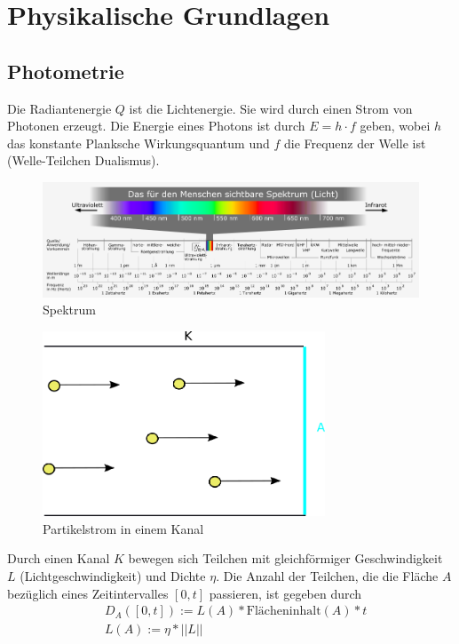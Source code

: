 

\section{Physikalische Grundlagen}

\subsection{Photometrie}

Die Radiantenergie $Q$ ist die Lichtenergie. Sie wird durch einen Strom von Photonen erzeugt. Die Energie eines Photons ist 
durch $E=h \cdot f$ geben, wobei $h$ das konstante Planksche Wirkungsquantum und $f$ die Frequenz der Welle ist (Welle-Teilchen Dualismus).  

 \begin{figure}[H]
    \centering
    \includegraphics[width=1.0\textwidth]{images/Electromagnetic_spectrum_c.png}
    \caption{Spektrum}
    \label{fig:cray}
\end{figure}


 \begin{figure}[H]
    \centering
    \includegraphics[width=0.75\textwidth]{images/Partikelstrom.png}
    \caption{Partikelstrom in einem Kanal}
    \label{fig:cray}
\end{figure}
Durch einen Kanal $K$ bewegen  sich Teilchen mit gleichförmiger Geschwindigkeit $L$ (Lichtgeschwindigkeit)  und  Dichte $\eta$.
Die Anzahl der Teilchen, die die Fläche $A$ bezüglich eines Zeitintervalles $[0,t]$ passieren, ist gegeben durch
\begin{align}
& D_A([0,t]) :=L(A) *  \text{Flächeninhalt}(A) *   t \\
& L(A):= \eta * ||L||  
\end{align}

